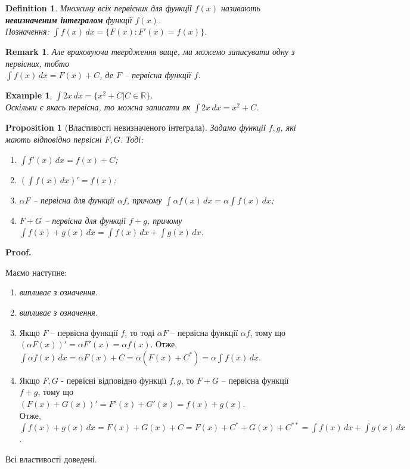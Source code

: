 \documentclass[a4paper, 10pt]{article}
\makeatletter
\def\huge{\displaystyle}
\theoremstyle{theoremdd}
\theoremstyle{theoremdd}
\theoremstyle{theoremdd}
\newtheorem{definition}[theorem]{Definition}
\theoremstyle{theoremdd}
\theoremstyle{theoremdd}
\newtheorem{example}[theorem]{Example}
\theoremstyle{theoremdd}
\newtheorem{proposition}[theorem]{Proposition}
\theoremstyle{theoremdd}
\newtheorem{remark}[theorem]{Remark}
\theoremstyle{theoremdd}
\theoremstyle{theoremdd}
\renewenvironment{proof}[1][Proof.\\]{\par
\pushQED{\hfill \qed}%
\normalfont \topsep6\p@\@plus6\p@\relax
\trivlist
\item\relax
{\bfseries
#1\@addpunct{.}}\hspace\labelsep\ignorespaces
}{%
\popQED\endtrivlist\@endpefalse
}
\makeatother
\begin{document}
\begin{definition}
Множину всіх первісних для функції $f(x)$ називають \textbf{невизначеним інтегралом} функції $f(x)$.\\
Позначення: $\huge \int f(x) \,dx = \{F(x): F'(x) = f(x)\}$.
\end{definition}

\begin{remark}
Але враховуючи твердження вище, ми можемо записувати одну з первісних, тобто \\
$\huge \int f(x) \,dx = F(x) + C$, де $F$ -- первісна функції $f$.
\end{remark}

\begin{example}
$\huge\int 2x \,dx = \{x^2 + C | C \in \mathbb{R}\}$.\\
Оскільки є якась первісна, то можна записати як $\huge\int 2x\,dx = x^2 + C$.
\end{example}

\begin{proposition}[Властивості невизначеного інтеграла]
Задамо функції $f,g$, які мають відповідно первісні $F,G$. Тоді:\\
\begin{enumerate}[nosep,wide=0pt,label={\arabic*)}]
\item $\huge \int f'(x)\,dx = f(x) + C$;
\item $\huge \left(\int f(x)\,dx \right)' = f(x)$;
\item $\alpha F$ -- первісна для функції $\alpha f$, причому $\huge \int \alpha f(x)\,dx = \alpha \int f(x)\,dx$;
\item $F+G$ -- первісна для функції $f+g$, причому $\huge \int f(x) + g(x) \,dx = \int f(x)\,dx + \int g(x)\,dx$.
\end{enumerate}
\end{proposition}

\begin{proof}
Маємо наступне:
\begin{enumerate}[nosep,wide=0pt,label={\arabic*)}]
\item \textit{випливає з означення.}
\item \textit{випливає з означення.}
\item Якщо $F$ -- первісна функції $f$, то тоді $\alpha F$ -- первісна функції $\alpha f$, тому що \\ $(\alpha F(x))' = \alpha F'(x) = \alpha f(x)$. Отже, $\huge\int \alpha f(x) \,dx = \alpha F(x) + C = \alpha \left( F(x) + C^* \right) = \alpha \int f(x)\,dx$.
\item Якщо $F,G$ - первісні відповідно функції $f,g$, то $F+G$ -- первісна функції $f+g$, тому що \\ $(F(x)+G(x))' = F'(x)+G'(x) = f(x)+g(x)$. \\ Отже, $\huge\int f(x)+g(x) \,dx = F(x) + G(x) + C = F(x) + C^* + G(x) + C^{**} = \int f(x)\,dx + \int g(x)\,dx$.
\end{enumerate}
Всі властивості доведені.
\end{proof}
\end{document}
